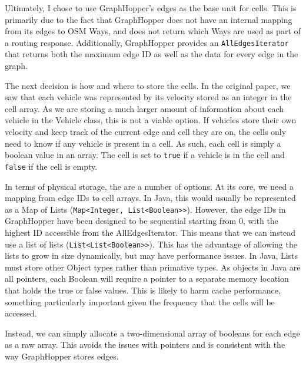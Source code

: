 \documentclass[ %
                    author={Alexander Hill},
                supervisor={Dr. Benjamin Sach},
                    degree={MEng},
                     title={MARMOSET},
                  subtitle={Multi-Agent Route Management using Online Simulation for Efficient Transportation},
                      type={research},
                      year={2016} ]{dissertation}
\begin{document}
Ultimately, I chose to use GraphHopper's edges as the base unit for cells. This
is primarily due to the fact that GraphHopper does not have an internal mapping
from its edges to OSM Ways, and does not return which Ways are used as part of a
routing response. Additionally, GraphHopper provides an
\texttt{AllEdgesIterator} that returns both the maximum edge ID as well as the
data for every edge in the graph.

The next decision is how and where to store the cells. In the original paper,
we saw that each vehicle was represented by its velocity stored as an integer in
the cell array. As we are storing a much larger amount of information about each
vehicle in the Vehicle class, this is not a viable option. If vehicles store
their own velocity and keep track of the current edge and cell they are on, the
cells only need to know if any vehicle is present in a cell. As such, each cell
is simply a boolean value in an array. The cell is set to \texttt{true} if a
vehicle is in the cell and \texttt{false} if the cell is empty.

In terms of physical storage, the are a number of options. At its core, we need
a mapping from edge IDs to cell arrays. In Java, this would usually be
represented as a Map of Lists (\texttt{Map<Integer, List<Boolean>>}). However,
the edge IDs in GraphHopper have been designed to be sequential starting from 0,
with the highest ID accessible from the AllEdgesIterator. This means that we can
instead use a list of lists (\texttt{List<List<Boolean>>}). This has the
advantage of allowing the lists to grow in size dynamically, but may have
performance issues. In Java, Lists must store other Object types rather than
primative types. As objects in Java are all pointers, each Boolean will require
a pointer to a separate memory location that holds the true or false values.
This is likely to harm cache performance, something particularly important given
the frequency that the cells will be accessed.

Instead, we can simply allocate a two-dimensional array of booleans for each
edge as a raw array. This avoids the issues with pointers and is consistent with
the way GraphHopper stores edges.
\end{document}
